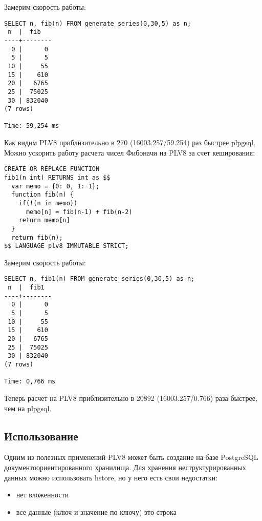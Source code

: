 Замерим скорость работы:

\begin{lstlisting}[label=lst:plv8js4,caption=Скорость расчета числа Фибоначчи на plv8]
SELECT n, fib(n) FROM generate_series(0,30,5) as n;
 n  |  fib
----+--------
  0 |      0
  5 |      5
 10 |     55
 15 |    610
 20 |   6765
 25 |  75025
 30 | 832040
(7 rows)

Time: 59,254 ms
\end{lstlisting}

Как видим PLV8 приблизительно в 270 (16003.257/59.254) раз быстрее plpgsql. Можно ускорить работу расчета чисел Фибоначи на PLV8 за счет кеширования:

\begin{lstlisting}[label=lst:plv8js5,caption=Фибоначчи на plv8]
CREATE OR REPLACE FUNCTION
fib1(n int) RETURNS int as $$
  var memo = {0: 0, 1: 1};
  function fib(n) {
    if(!(n in memo))
      memo[n] = fib(n-1) + fib(n-2)
    return memo[n]
  }
  return fib(n);
$$ LANGUAGE plv8 IMMUTABLE STRICT;
\end{lstlisting}

Замерим скорость работы:

\begin{lstlisting}[label=lst:plv8js6,caption=Скорость расчета числа Фибоначчи на plv8]
SELECT n, fib1(n) FROM generate_series(0,30,5) as n;
 n  |  fib1
----+--------
  0 |      0
  5 |      5
 10 |     55
 15 |    610
 20 |   6765
 25 |  75025
 30 | 832040
(7 rows)

Time: 0,766 ms
\end{lstlisting}

Теперь расчет на PLV8 приблизительно в 20892 (16003.257/0.766) раза быстрее, чем на plpgsql.

\subsection{Использование}

Одним из полезных применений PLV8 может быть создание на базе PostgreSQL документоориентированного хранилища. Для хранения неструктурированных данных можно использовать hstore, но у него есть свои недостатки:

\begin{itemize}
\item нет вложенности
\item все данные (ключ и значение по ключу) это строка
\end{itemize}

